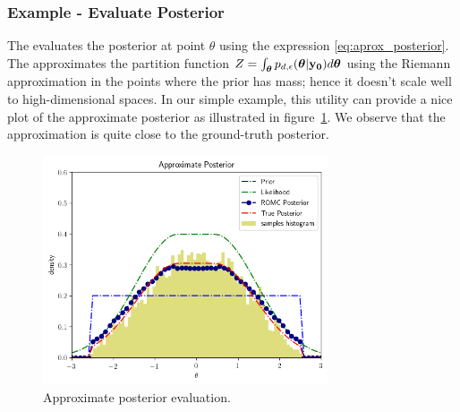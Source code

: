 \subsubsection*{Example - Evaluate Posterior}

The  evaluates the
posterior at point $\theta$ using the expression
\eqref{eq:aprox_posterior}. The 
approximates the partition function
$Z = \int_{\boldsymbol{\theta}} p_{d,\epsilon}(\boldsymbol{\theta}|\mathbf{y_0}) d\boldsymbol{\theta}$ using the
Riemann approximation in the points where the prior has mass; hence it
doesn't scale well to high-dimensional spaces. In our simple example,
this utility can provide a nice plot of the approximate posterior as
illustrated in figure~\ref{fig:approx_posterior}. We observe that the
approximation is quite close to the ground-truth posterior.

\begin{figure}[h]
    \begin{center}
      \includegraphics[width=0.75\textwidth]{./Thesis/images/chapter3/example_posterior.png}
    \end{center}
  \caption{Approximate posterior evaluation.}
  \label{fig:approx_posterior}
\end{figure}
